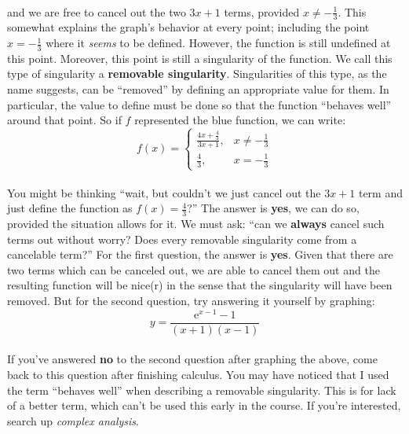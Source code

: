 \documentclass[12pt, a4paper, titlepage, twoside]{article}
\newcommand*{\e}{\textrm{e}}
\begin{document}
	\paragraph{}
	and we are free to cancel out the two $3x+1$ terms, provided $x \neq -\frac{1}{3}$. This somewhat explains the graph's behavior at every
	point; including the point $x = -\frac{1}{3}$ where it \textit{seems} to be defined. However, the function is still undefined at this point. 
	Moreover, this point is still a singularity of the function. We call this type of singularity a \textbf{removable singularity}. Singularities of this
	type, as the name suggests, can be ``removed'' by defining an appropriate value for them. In particular, the value to define must be done
	so that the function ``behaves well'' around that point. So if $f$ represented the blue function, we can write:
	\[ f(x) = \begin{cases} \frac{4x+\tfrac{4}{3}}{3x+1}, & x \neq -\frac{1}{3} \\ \frac{4}{3}, &  x = -\frac{1}{3} \end{cases} \]
	
	\paragraph{}
	You might be thinking ``wait, but couldn't we just cancel out the $3x+1$ term and just define the function as $f(x) = \frac{4}{3}$?''
	The answer is \textbf{yes}, we can do so, provided the situation allows for it. We must ask: ``can we \textbf{always} cancel such terms
	out without worry? Does every removable singularity come from a cancelable term?'' For the first question, the answer is \textbf{yes}. Given
	that there are two terms which can be canceled out, we are able to cancel them out and the resulting function will be nice(r) in the sense
	that the singularity will have been removed. But for the second question, try answering it yourself by graphing:
	\[ y = \dfrac{\e^{x-1} -1}{(x+1)(x-1)} \]
	
	\paragraph{}
	If you've answered \textbf{no} to the second question after graphing the above, come back to this question after finishing calculus.
	You may have noticed that I used the term ``behaves well'' when describing a removable singularity. This is for lack of a better term,
	which can't be used this early in the course. If you're interested, search up \textit{complex analysis}.
	
\end{document}
